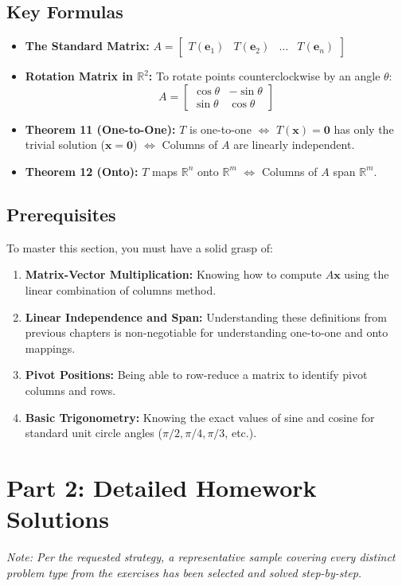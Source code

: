 \documentclass[11pt]{article}
\begin{document}
\subsection{Key Formulas}
\begin{itemize}
    \item \textbf{The Standard Matrix:} $A = \begin{bmatrix} T(\mathbf{e}_1) & T(\mathbf{e}_2) & \dots & T(\mathbf{e}_n) \end{bmatrix}$
    \item \textbf{Rotation Matrix in $\mathbb{R}^2$:} To rotate points counterclockwise by an angle $\theta$:
    \[ A = \begin{bmatrix} \cos\theta & -\sin\theta \\ \sin\theta & \cos\theta \end{bmatrix} \]
    \item \textbf{Theorem 11 (One-to-One):} $T$ is one-to-one $\iff$ $T(\mathbf{x}) = \mathbf{0}$ has only the trivial solution ($\mathbf{x} = \mathbf{0}$) $\iff$ Columns of $A$ are linearly independent.
    \item \textbf{Theorem 12 (Onto):} $T$ maps $\mathbb{R}^n$ onto $\mathbb{R}^m$ $\iff$ Columns of $A$ span $\mathbb{R}^m$.
\end{itemize}

\subsection{Prerequisites}
To master this section, you must have a solid grasp of:
\begin{enumerate}
    \item \textbf{Matrix-Vector Multiplication:} Knowing how to compute $A\mathbf{x}$ using the linear combination of columns method.
    \item \textbf{Linear Independence and Span:} Understanding these definitions from previous chapters is non-negotiable for understanding one-to-one and onto mappings.
    \item \textbf{Pivot Positions:} Being able to row-reduce a matrix to identify pivot columns and rows.
    \item \textbf{Basic Trigonometry:} Knowing the exact values of sine and cosine for standard unit circle angles ($\pi/2, \pi/4, \pi/3$, etc.).
\end{enumerate}

\newpage
\section{Part 2: Detailed Homework Solutions}
\textit{Note: Per the requested strategy, a representative sample covering every distinct problem type from the exercises has been selected and solved step-by-step.}
\end{document}
